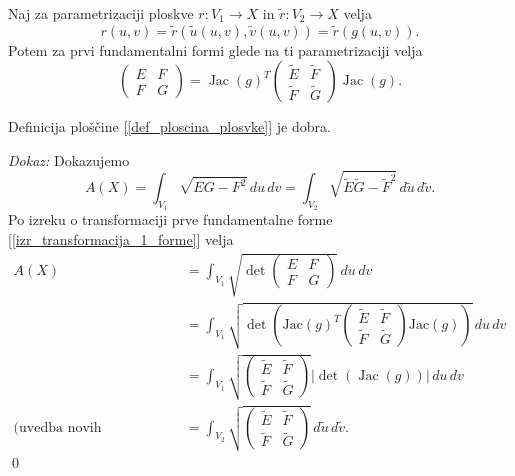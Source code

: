 \begin{izrek}
\label{izr_transformacija_1_forme}
  Naj za parametrizaciji ploskve $r: V_1 \to  X$ in $\tilde{r}: V_2 \to X$ velja 
  \begin{equation*} r(u,v) = \tilde{r}(\tilde{u}(u,v), \tilde{v}(u,v)) = \tilde{r}(g(u,v)).\end{equation*}
  Potem za prvi fundamentalni formi glede na ti parametrizaciji velja 
  \begin{equation*} \begin{pmatrix}
  E & F \\
  F & G
  \end{pmatrix} = \operatorname{Jac}(g)^{T}
  \begin{pmatrix}
    \tilde{E} & \tilde{F} \\
    \tilde{F} & \tilde{G}
    \end{pmatrix}
  \operatorname{Jac}(g). \end{equation*}
\end{izrek}

\begin{posledica}
\label{psl_dobra_definiranost_ploscine}
 Definicija ploščine [\ref{def_ploscina_plosvke}] je dobra.
\end{posledica}
\noindent
{\em Dokaz:\/}
 Dokazujemo 
 \begin{equation*} A(X) = \int_{V_1} \sqrt{EG - F^2}   \, du \, dv = \int_{V_2}  \sqrt{\tilde{E}\tilde{G} -  \tilde{F}^2}  \, d \tilde{u} \, d \tilde{v}.\end{equation*}
 Po izreku o transformaciji prve fundamentalne forme [\ref{izr_transformacija_1_forme}] velja 
 \begin{align*}
     A(X) &= \int_{V_1} \sqrt{\det \begin{pmatrix}
     E & F \\
     F & G
     \end{pmatrix}}   \, du \, dv \\
      &= \int_{V_1}  \sqrt{\det \left( \text{Jac}(g)^{T}
      \begin{pmatrix}
        \tilde{E} & \tilde{F} \\
        \tilde{F} & \tilde{G}
        \end{pmatrix}
      \text{Jac}(g) \right) }   \, du \, dv \\ 
      &= \int_{V_1} \sqrt{\begin{pmatrix}
        \tilde{E} & \tilde{F} \\
        \tilde{F} & \tilde{G}
      \end{pmatrix}} \left| \det \left( \operatorname{Jac}(g) \right) \right|  \, du \, dv \\ 
     \text{(uvedba novih spremenljivk)} &= \int_{V_2} \sqrt{\begin{pmatrix}
      \tilde{E} & \tilde{F} \\
      \tilde{F} & \tilde{G}
      \end{pmatrix}}   \, d \tilde{u} \, d \tilde{v}.  
 \end{align*}
\qed

